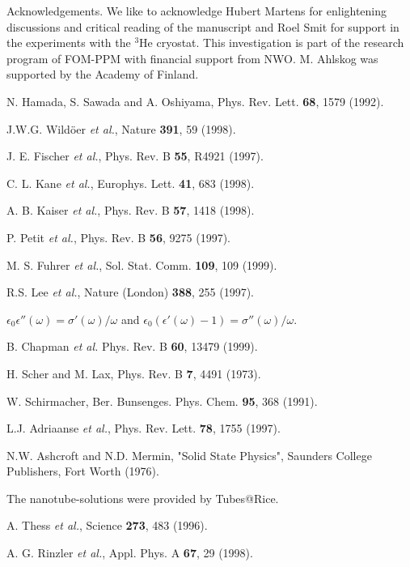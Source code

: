 \begin{multicols}{2}
Acknowledgements. We like to acknowledge Hubert Martens for enlightening
discussions and critical reading of the manuscript and Roel Smit for support
in the experiments with the $^3$He cryostat. This investigation is part of
the research program of FOM-PPM with financial support from NWO. M. Ahlskog
was supported by the Academy of Finland.

\begin{thebibliography}{10}

{N. Hamada, S. Sawada and A. Oshiyama, Phys. Rev. Lett. {\bf 68}, 1579
(1992).}

{J.W.G. Wild\"{o}er {\sl et al.}, Nature {\bf 391}, 59 (1998).}

{J. E. Fischer {\sl et al.}, Phys. Rev. B {\bf 55}, R4921 (1997).}

{C. L. Kane {\sl et al.}, Europhys. Lett. {\bf 41}, 683 (1998).}

{A. B. Kaiser {\sl et al.}, Phys. Rev. B {\bf 57}, 1418 (1998).}

{P. Petit {\sl et al.}, Phys. Rev. B {\bf 56}, 9275 (1997). }

{M. S. Fuhrer {\sl et al.}, Sol. Stat. Comm. {\bf 109}, 109 (1999).}

{R.S. Lee {\sl et al.}, Nature (London) {\bf 388}, 255 (1997). }

 $\epsilon_0 \epsilon''(\omega)=\sigma'(\omega)/ \omega$ and
$\epsilon_0(\epsilon'(\omega)-1)=\sigma''(\omega)/\omega$.

 B. Chapman {\it et al.} Phys. Rev. B {\bf 60}, 13479
(1999).

{H. Scher and M. Lax, Phys. Rev. B {\bf 7}, 4491 (1973).}

{W. Schirmacher, Ber. Bunsenges. Phys. Chem. {\bf 95}, 368 (1991). }

{L.J. Adriaanse {\sl et al.}, Phys. Rev. Lett. {\bf 78}, 1755 (1997).}

{N.W. Ashcroft and N.D. Mermin, "Solid State Physics", Saunders College
 Publishers, Fort Worth (1976). }

{The nanotube-solutions were provided by Tubes@Rice. }

{A. Thess {\sl et al.}, Science {\bf 273}, 483 (1996).}

{A. G. Rinzler {\sl et al.}, Appl. Phys. A {\bf 67}, 29 (1998).}


\end{thebibliography}
\end{multicols}
